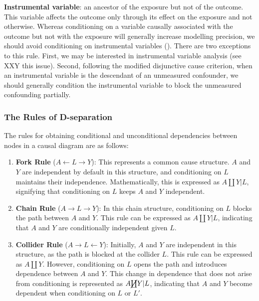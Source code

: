 \documentclass[
  singlecolumn,
  9pt]{article}
\begin{document}
\textbf{Instrumental variable}: an ancestor of the exposure but not of
the outcome. This variable affects the outcome only through its effect
on the exposure and not otherwise. Whereas conditioning on a variable
causally associated with the outcome but not with the exposure will
generally increase modelling precision, we should avoid conditioning on
instrumental variables (). There are two exceptions to this rule. First, we may be
interested in instrumental variable analysis (see XXY this issue).
Second, following the modified disjunctive cause criterion, when an
instrumental variable is the descendant of an unmeasured confounder, we
should generally condition the instrumental variable to block the
unmeasured confounding partially.

\subsubsection{The Rules of
D-separation}\label{the-rules-of-d-separation}

The rules for obtaining conditional and unconditional dependencies
between nodes in a causal diagram are as follows:

\begin{enumerate}
\def\labelenumi{\arabic{enumi}.}
\item
  \textbf{Fork Rule} (\(A \leftarrow L \rightarrow Y\)): This represents
  a common cause structure. \(A\) and \(Y\) are independent by default
  in this structure, and conditioning on \(L\) maintains their
  independence. Mathematically, this is expressed as \(A \coprod Y|L\),
  signifying that conditioning on \(L\) keeps \(A\) and \(Y\)
  independent.
\item
  \textbf{Chain Rule} (\(A \rightarrow L \rightarrow Y\)): In this chain
  structure, conditioning on \(L\) blocks the path between \(A\) and
  \(Y\). This rule can be expressed as \(A \coprod Y | L\), indicating
  that \(A\) and \(Y\) are conditionally independent given \(L\).
\item
  \textbf{Collider Rule} (\(A \rightarrow L \leftarrow Y\)): Initially,
  \(A\) and \(Y\) are independent in this structure, as the path is
  blocked at the collider \(L\). This rule can be expressed as
  \(A \coprod Y\). However, conditioning on \(L\) opens the path and
  introduces dependence between \(A\) and \(Y\). This change in
  dependence that does not arise from conditioning is represented as
  \(A \cancel{\coprod} Y | L\), indicating that \(A\) and \(Y\) become
  dependent when conditioning on \(L\) or \(L'\).
\end{enumerate}
\end{document}
